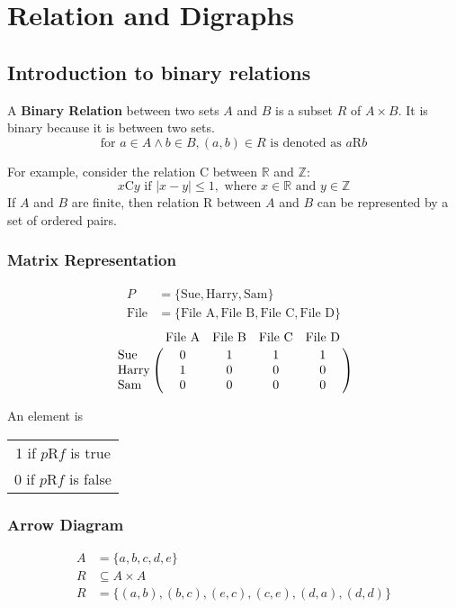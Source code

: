 \section{Relation and Digraphs}
\subsection{Introduction to binary relations}

A \textbf{Binary Relation} between two sets $A$ and $B$ is a subset $R$ of $A \times B$.
It is binary because it is between two sets.
\[
  \text{for } a \in A \land b \in B, (a,b) \in R \text{ is denoted as } a\text{R}b
\]

For example, consider the relation C between $\mathbb{R}$ and $\mathbb{Z}$:
\[
  x\text{C}y \text{ if } \left\lvert x-y\right\rvert \leq 1, \text{ where } x \in \mathbb{R} \text{ and } y \in \mathbb{Z}
\]
If $A$ and $B$ are finite, then relation R between $A$ and $B$ can be represented by a set of ordered pairs.

\subsubsection{Matrix Representation}
\begin{align*}
  P           & = \{\text{Sue}, \text{Harry}, \text{Sam}\}                       \\
  \text{File} & = \{\text{File A}, \text{File B}, \text{File C}, \text{File D}\}
\end{align*}
\[
  \bordermatrix{ & \text{File A} & \text{File B} & \text{File C} & \text{File D} \cr
    \text{Sue}   & 0 & 1 & 1 & 1 \cr
    \text{Harry} & 1 & 0 & 0 & 0 \cr
    \text{Sam}   & 0 & 0 & 0 & 0 \cr }
\]
\begin{center}
  An element is
  \begin{tabular}{c}
    1 if $p$R$f$ is true \\
    0 if $p$R$f$ is false
  \end{tabular}
\end{center}

\subsubsection{Arrow Diagram}
\begin{align*}
  A & = \{a,b,c,d,e\}                                \\
  R & \subseteq A \times A                           \\
  R & = \{(a,b), (b,c), (e,c), (c,e), (d,a), (d,d)\}
\end{align*}

